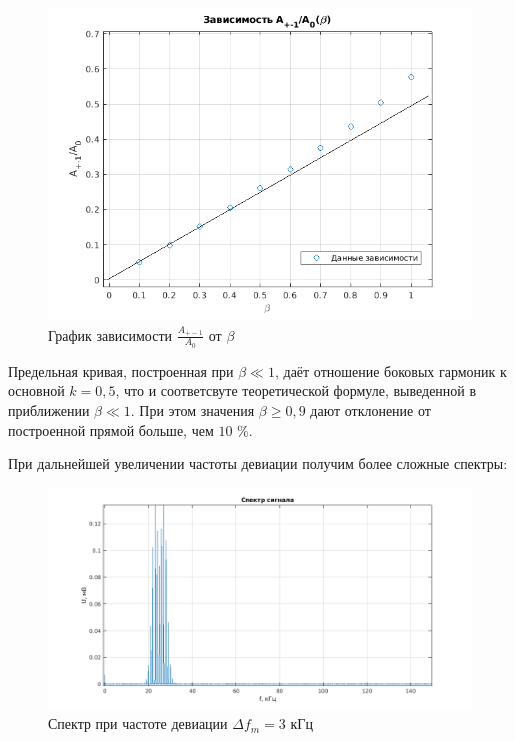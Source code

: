 \begin{figure}[h!]
    \centering
    \includegraphics[width = 13 cm]{images/4_appr.png}
    \caption{График зависимости $\frac{A_{+-1}}{A_{0}}$ от $\beta$}
\end{figure}

Предельная кривая, построенная при $\beta \ll 1$, даёт отношение боковых гармоник к основной $k = 0,5$, что и соответсвуте теоретической формуле, выведенной в приближении $\beta \ll 1$. При этом значения $\beta \geqslant 0,9$ дают отклонение от построенной прямой больше, чем $10$ \%.

При дальнейшей увеличении частоты девиации получим более сложные спектры:

\begin{figure}[h!]
    \centering
    \includegraphics[width = 15 cm]{images/4_3.png}
    \caption{Спектр при частоте девиации $\Delta f_m = 3$ кГц}
\end{figure}

